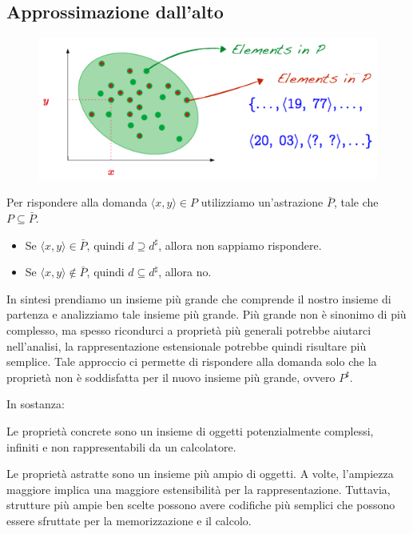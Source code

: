 \subsection{Approssimazione dall'alto}
\begin{figure}[H]
  \centering
  \includegraphics[scale=0.5]{img/approx.png}
\end{figure}
Per rispondere alla domanda $\langle x, y \rangle \in P$ utilizziamo un'astrazione $\bar{P}$,
tale che $P \subseteq \bar{P}$.
\begin{itemize}
  \item Se $\langle x, y \rangle \in \bar{P}$, quindi $d \supseteq d^\sharp$, allora non sappiamo rispondere.
  \item Se $\langle x, y \rangle \notin \bar{P}$, quindi $d \subseteq d^\sharp$, allora no.
\end{itemize}
In sintesi prendiamo un insieme più grande che comprende il nostro insieme di partenza e
analizziamo tale insieme più grande. Più grande non è sinonimo di più complesso, ma spesso 
ricondurci a proprietà più generali potrebbe aiutarci nell'analisi, la rappresentazione estensionale 
potrebbe quindi risultare più semplice. Tale approccio ci permette 
di rispondere alla domanda solo che la proprietà non è soddisfatta per il nuovo insieme più grande, 
ovvero $P^\sharp$.

In sostanza:
\begin{tcolorbox}[title=Proprietà concrete]
Le proprietà concrete sono un insieme di oggetti potenzialmente complessi, infiniti e non rappresentabili
da un calcolatore.
\end{tcolorbox}

\begin{tcolorbox}[title=Proprietà astratte]
  Le proprietà astratte sono un insieme più ampio di oggetti. A volte, l'ampiezza maggiore
  implica una maggiore estensibilità per la rappresentazione. Tuttavia, strutture più ampie
  ben scelte possono
  avere codifiche più semplici che possono essere sfruttate per la memorizzazione e il calcolo.
\end{tcolorbox}
